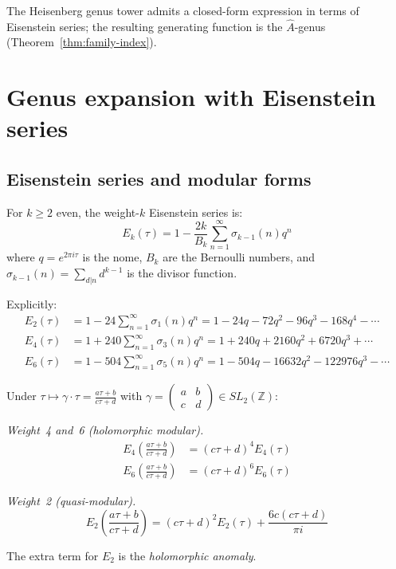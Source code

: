 
The Heisenberg genus tower admits a closed-form expression in terms of Eisenstein series; the resulting generating function is the $\hat{A}$-genus (Theorem~\ref{thm:family-index}).

\section{Genus expansion with Eisenstein series}
\label{sec:heisenberg-genus-expansion-eisenstein}

\subsection{Eisenstein series and modular forms}
\label{subsec:eisenstein-recollection}

\begin{definition}\label{def:eisenstein-series}
For $k \geq 2$ even, the weight-$k$ Eisenstein series is:
\begin{equation}
E_k(\tau) = 1 - \frac{2k}{B_k} \sum_{n=1}^{\infty} \sigma_{k-1}(n) q^n
\end{equation}
where $q = e^{2\pi i \tau}$ is the nome, $B_k$ are the Bernoulli numbers, and $\sigma_{k-1}(n) = \sum_{d|n} d^{k-1}$ is the divisor function.

Explicitly:
\begin{align}
E_2(\tau) &= 1 - 24\sum_{n=1}^{\infty} \sigma_1(n) q^n 
= 1 - 24q - 72q^2 - 96q^3 - 168q^4 - \cdots \label{eq:E2-expansion} \\
E_4(\tau) &= 1 + 240\sum_{n=1}^{\infty} \sigma_3(n) q^n 
= 1 + 240q + 2160q^2 + 6720q^3 + \cdots \label{eq:E4-expansion} \\
E_6(\tau) &= 1 - 504\sum_{n=1}^{\infty} \sigma_5(n) q^n 
= 1 - 504q - 16632q^2 - 122976q^3 - \cdots \label{eq:E6-expansion}
\end{align}
\end{definition}

\begin{proposition}\label{prop:eisenstein-modular}
Under $\tau \mapsto \gamma \cdot \tau = \frac{a\tau + b}{c\tau + d}$ with 
$\gamma = \begin{pmatrix} a & b \\ c & d \end{pmatrix} \in SL_2(\mathbb{Z})$:

\emph{Weight~4 and~6 (holomorphic modular).}
\begin{align}
E_4\left(\frac{a\tau+b}{c\tau+d}\right) &= (c\tau + d)^4 E_4(\tau) \\
E_6\left(\frac{a\tau+b}{c\tau+d}\right) &= (c\tau + d)^6 E_6(\tau)
\end{align}

\emph{Weight~2 (quasi-modular).}
\begin{equation}
E_2\left(\frac{a\tau+b}{c\tau+d}\right) = (c\tau + d)^2 E_2(\tau)
+ \frac{6c(c\tau + d)}{\pi i}
\end{equation}

The extra term for $E_2$ is the \emph{holomorphic anomaly}.
\end{proposition}

